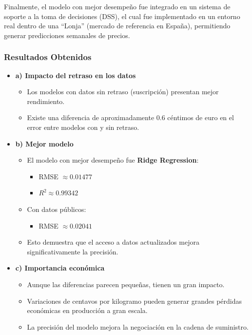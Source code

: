 Finalmente, el modelo con mejor desempeño fue integrado en un sistema de soporte a la toma de decisiones (DSS), el cual fue implementado en un entorno real dentro de una “Lonja” (mercado de referencia en España), permitiendo generar predicciones semanales de precios.

\subsubsection{Resultados Obtenidos}

	\begin{itemize}

		\item \textbf{a) Impacto del retraso en los datos}
		\begin{itemize}
			\item Los modelos con datos sin retraso (suscripción) presentan mejor rendimiento.
			\item Existe una diferencia de aproximadamente 0.6 céntimos de euro en el error entre modelos con y sin retraso.
		\end{itemize}

		\item \textbf{b) Mejor modelo}
		\begin{itemize}
			\item El modelo con mejor desempeño fue \textbf{Ridge Regression}:
			\begin{itemize}
				\item RMSE $\approx 0.01477$
				\item $R^2 \approx 0.99342$
			\end{itemize}
			\item Con datos públicos:
			\begin{itemize}
				\item RMSE $\approx 0.02041$
			\end{itemize}
			\item Esto demuestra que el acceso a datos actualizados mejora significativamente la precisión.
		\end{itemize}

		\item \textbf{c) Importancia económica}
		\begin{itemize}
			\item Aunque las diferencias parecen pequeñas, tienen un gran impacto.
			\item Variaciones de centavos por kilogramo pueden generar grandes pérdidas económicas en producción a gran escala.
			\item La precisión del modelo mejora la negociación en la cadena de suministro.
		\end{itemize}


\end{itemize}
